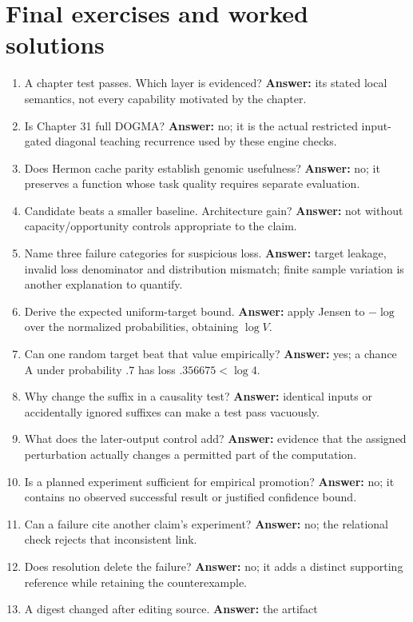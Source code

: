 \section{Final exercises and worked solutions}
\begin{enumerate}
\item A chapter test passes. Which layer is evidenced? \textbf{Answer:}
its stated local semantics, not every capability motivated by the chapter.
\item Is Chapter 31 full DOGMA? \textbf{Answer:} no; it is the actual restricted
input-gated diagonal teaching recurrence used by these engine checks.
\item Does Hermon cache parity establish genomic usefulness? \textbf{Answer:}
no; it preserves a function whose task quality requires separate evaluation.
\item Candidate beats a smaller baseline. Architecture gain? \textbf{Answer:}
not without capacity/opportunity controls appropriate to the claim.
\item Name three failure categories for suspicious loss. \textbf{Answer:}
target leakage, invalid loss denominator and distribution mismatch; finite
sample variation is another explanation to quantify.
\item Derive the expected uniform-target bound. \textbf{Answer:} apply Jensen
to $-\log$ over the normalized probabilities, obtaining $\log V$.
\item Can one random target beat that value empirically? \textbf{Answer:}
yes; a chance A under probability $.7$ has loss $.356675<\log4$.
\item Why change the suffix in a causality test? \textbf{Answer:} identical
inputs or accidentally ignored suffixes can make a test pass vacuously.
\item What does the later-output control add? \textbf{Answer:} evidence that
the assigned perturbation actually changes a permitted part of the computation.
\item Is a planned experiment sufficient for empirical promotion? \textbf{Answer:}
no; it contains no observed successful result or justified confidence bound.
\item Can a failure cite another claim's experiment? \textbf{Answer:} no;
the relational check rejects that inconsistent link.
\item Does resolution delete the failure? \textbf{Answer:} no; it adds a
distinct supporting reference while retaining the counterexample.
\item A digest changed after editing source. \textbf{Answer:} the artifact

\end{enumerate}
